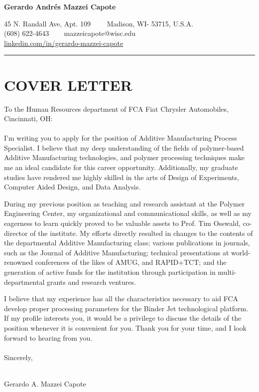 \documentclass[12pt,letterpaper]{article}
\begin{document}
\begin{center}
	{\LARGE \textbf{Gerardo Andrés Mazzei Capote}}

	45 N. Randall Ave, Apt. 109\ \ \textbullet
	\ \ Madison, WI- 53715, U.S.A.
	\\
	(608) 622-4643 \ \textbullet
	\ \ mazzeicapote@wisc.edu\\
	\href{https://www.linkedin.com/in/gerardo-mazzei-capote}{linkedin.com/in/gerardo-mazzei-capote}
	
\end{center}
\vspace{-0.5em}
\hrule
\vspace{0.4em}
\vspace{-1em}

\section*{COVER LETTER}
\vspace{0.4em}
To the Human Resources department of FCA Fiat Chrysler Automobiles, Cincinnati, OH:
\\
\\
I'm writing you to apply for the position of Additive Manufacturing Process Specialist. I believe that my deep understanding of the fields of polymer-based Additive Manufacturing technologies, and polymer processing techniques make me an ideal candidate for this career opportunity. Additionally, my graduate studies have rendered me highly skilled in the arts of Design of Experiments, Computer Aided Design, and Data Analysis.

During my previous position as teaching and research assistant at the Polymer Engineering Center, my organizational and communicational skills, as well as my eagerness to learn quickly proved to be valuable assets to Prof. Tim Osswald, co-director of the institute. My efforts directly resulted in changes to the contents of the departmental Additive Manufacturing class; various publications in journals, such as the Journal of Additive Manufacturing; technical presentations at world-renowned conferences of the likes of AMUG, and RAPID+TCT; and the generation of active funds for the institution through participation in multi-departmental grants and research ventures. 

I believe that my experience has all the characteristics necessary to aid FCA develop proper processing parameters for the Binder Jet technological platform.  If my profile interests you, it would be a privilege to discuss the details of the position whenever it is convenient for you. Thank you for your time, and I look forward to hearing from you.
\\
\\
Sincerely,
\\
\\
\begin{center}
Gerardo A. Mazzei Capote
\end{center}
\end{document}

